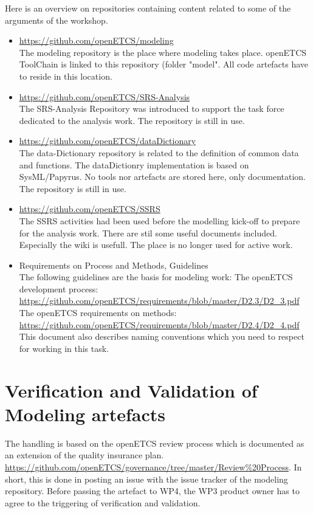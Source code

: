 \documentclass{template/openetcs_report}
\begin{document}
 Here is an overview on repositories containing content related to some of the arguments of the workshop.

\begin{itemize}
\item \url{https://github.com/openETCS/modeling}\\
The modeling repository is the place where modeling takes place. openETCS ToolChain is linked to this repository (folder "model". All code artefacts have to reside in this location. 


\item \url{https://github.com/openETCS/SRS-Analysis}\\
The SRS-Analysis Repository was introduced to support the task force dedicated to the analysis work.
 The repository is still in use.

\item \url{https://github.com/openETCS/dataDictionary}\\
The data-Dictionary repository is related to the definition of common data and functions. The dataDictionry implementation is based on SysML/Papyrus. No tools nor artefacts are stored here, only documentation. The repository is still in use.

\item \url{https://github.com/openETCS/SSRS}\\
The SSRS activities had been used before the modelling kick-off to prepare for the analysis work. There are stil some useful documents included. Especially the wiki is usefull.
The place is no longer used for active work. 

\item Requirements on Process and Methods, Guidelines\\
The following guidelines are the basis for modeling work:
The openETCS development process: \url{https://github.com/openETCS/requirements/blob/master/D2.3/D2_3.pdf}\\
The openETCS requirements on methods: \url{https://github.com/openETCS/requirements/blob/master/D2.4/D2_4.pdf} 
This document also describes naming conventions which you need to respect for working in this task.

\end{itemize}


%

\section{Verification and Validation of Modeling artefacts}
The handling is based on the openETCS review process which is documented as an extension of the quality insurance plan. \url{https://github.com/openETCS/governance/tree/master/Review%20Process}.
In short, this is done in posting an issue with the issue tracker of the modeling repository. 
Before passing the artefact to WP4, the WP3 product owner has to agree to the triggering of verification and validation.

%

\nocite{*}
\end{document}

